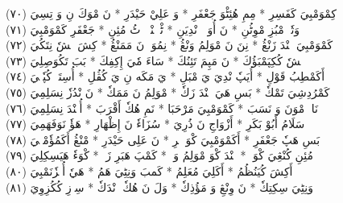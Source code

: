 \documentclass[a4paper, 10pt]{report}
\begin{document}
\begin{center}
\textarabic{(٧٠) \textcolor{mygreen}{كِمْوَمْبِيَ كَفَسِرِ  * مِمِ هُئِٹْوَ جَعْفَرِ  * وَ عَلِيْ حَيْدَرِ  * نَ مْوَكَ نِ وَ تِسِيَ }} 
\\[5mm] 

\textarabic{(٧١) \textcolor{mygreen}{وَتٗوٖ مْبُزِ مْوِٹُنِ  * نَ أُوَپٖكٖ نْدِيَنِ  * ٹْوٖنٖنْدٖ زٖٹُ مُئِنِ  * جَعْفَرِ كَمْوَمْبِيَ }} 
\\[5mm] 

\textarabic{(٧٢) \textcolor{mygreen}{كَمْوَمْبِيَ نٖنْدَ زَنْڠُ  * نِنَ نَ مْوَلِمُ وَنْڠُ  * نِمُوَڠٖ نَ مَمَنْڠُ  * كِشَ كٖشٗ نِتَكُيَ }} 
\\[5mm] 

\textarabic{(٧٣) \textcolor{mygreen}{كٖشٗ كُكِپَمْبَؤُكَ  * نَ مَپِمَ تَئِنُكَ  * سَاءَ مٗيَ إِكِفِكَ  * بَبَ تَكُوَصِلِيَ }} 
\\[5mm] 

\textarabic{(٧٤) \textcolor{mygreen}{أَكَمْطِبُ قَوْلِ  * أُيَپٗ نْدِيَ يَ مْبَلِ  * يَ مَكَه نِ يَ كُڤُلِ  * أُسِتَكٖ كُپٗتٖيَ }} 
\\[5mm] 

\textarabic{(٧٥) \textcolor{mygreen}{كَمْرُدِشِيَ تَمْكٗ  * بَسِ هَيَ نٖنْدَ زَكٗ  * مْوَلِمُ نَ مَمَكٗ  * نَ نْدُزٗ نِسَلِمِيَ }} 
\\[5mm] 

\textarabic{(٧٦) \textcolor{mygreen}{نَاءٖ مْوَنَ وَ نَسَبَ  * كَمْوَمْبِيَ مَرْحَبَا  * نَمِ هُكٗ أَقْرَبَ  * أُچٖنْدَ نِسَلِمِيَ }} 
\\[5mm] 

\textarabic{(٧٧) \textcolor{mygreen}{سَلَامُ أَبُوْ بَكَرِ  * أَزْوَاجِ نَ ذُرِيَ  * سُزَاءٗ نَ إِظْهَارِ  * هَؤٗ نَوَفَهَمِيَ }} 
\\[5mm] 

\textarabic{(٧٨) \textcolor{mygreen}{بَسِ هَپٗ جَعْفَرِ  * أَكَمْوَمْبِيَ كْوَ هٖرِ  * نَ عَلِى حَيْدَرِ  * مْنْڠُ أَكَمُؤٗمْبٖيَ }} 
\\[5mm] 

\textarabic{(٧٩) \textcolor{mygreen}{مُئِنِ كُنْڠِيَ كْوَكٖ  * كٖنْدَ كْوَ مْوَلِمُ وَكٖ  * كَمْپَ هَبَرِ زَكٖ  * كْوَءٗ هَيَسِكِلِيَ }} 
\\[5mm] 

\textarabic{(٨٠) \textcolor{mygreen}{أَكِشَ كُيَنُظُمُ  * أَكَلِيَ مُعَلِمُ  * كَمبَ وَنِٹِيَ هَمُ  * هَيٗ أُمٖزٗنَمْبِيَ }} 
\\[5mm] 

\textarabic{(٨١) \textcolor{mygreen}{وَنِٹِيَ سِكِتِكٗ  * نَ وِنْڠِ وَ مَؤُذِكٗ  * وَلَ نَ هُكٗ وٖنْدَكٗ  * سِوٖزِ كُكُزِوِيَ }} 
\\[5mm] 


\end{center}
\end{document}
